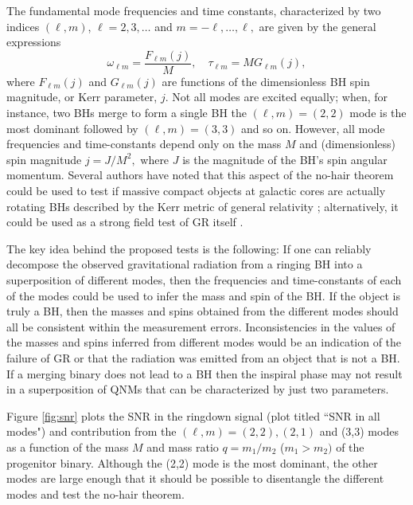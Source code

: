 The fundamental mode frequencies and time constants, characterized 
by two indices $(\ell,m)$, $\ell=2,3,\ldots$ and $m=-\ell,\ldots,\ell,$
are given by the general expressions
\begin{equation}
\omega_{\ell m} = \frac{F_{\ell m}(j)}{M},\quad
\tau_{\ell m} = M G_{\ell m}(j),
\end{equation}
where $F_{\ell m}(j)$ and $G_{\ell m}(j)$ are functions of 
the dimensionless BH spin magnitude, or Kerr parameter, $j$.  
Not all modes are excited equally; when, for instance, two BHs
merge to form a single BH the $(\ell,m)=(2,2)$ mode is the
most dominant followed by $(\ell,m)=(3,3)$ and so on. However,
all mode frequencies and time-constants depend only on the mass 
$M$ and (dimensionless) spin magnitude $j=J/M^2,$ where $J$ is
the magnitude of the BH's spin angular momentum. 
Several authors have noted that this 
aspect of the no-hair theorem could be used to test if massive 
compact objects at galactic cores are actually rotating BHs 
described by the Kerr metric of general relativity 
\cite{BHspect04,BCW05,Berti:2007a}; alternatively, it could be used 
as a strong field test of GR itself \cite{BHspect04}. 

The key idea behind the proposed tests is the following: If one can reliably 
decompose the observed gravitational radiation from a ringing BH into 
a superposition of different modes, then the frequencies and time-constants of 
each of the modes could be used to infer the mass and spin of the BH.
If the object is truly a BH, then the masses and spins obtained
from the different modes should all be consistent within the measurement
errors. Inconsistencies in the values of the masses and spins inferred 
from different modes would be an indication of the failure of GR or that the
radiation was emitted from an object that is not a BH. If a merging
binary does not lead to a BH then the inspiral phase may not
result in a superposition of QNMs that can be characterized by 
just two parameters.  

Figure \ref{fig:snr} plots the SNR in the ringdown
signal (plot titled ``SNR in all modes") and contribution from 
the $(\ell,m)=(2,2), (2,1)$ and (3,3) modes 
as a function of the mass $M$ and mass ratio $q=m_1/m_2$ ($m_1>m_2)$
of the progenitor binary.  Although the (2,2) mode is the most dominant, 
the other modes are large enough that it should be possible to 
disentangle the different modes and test the no-hair theorem.

